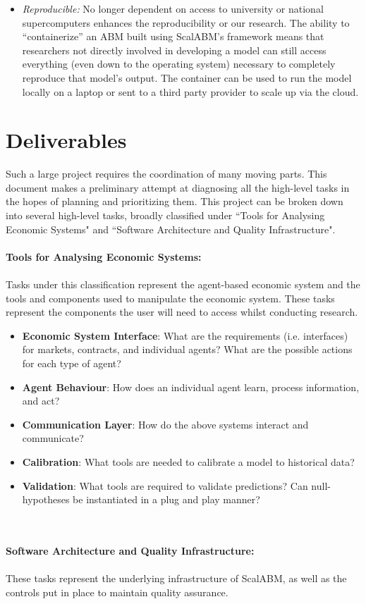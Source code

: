 \documentclass[a4paper]{article}
\begin{document}
\begin{itemize}
\item \textit{Reproducible:} No longer dependent on access to university or national supercomputers enhances the reproducibility or our research.  The ability to ``containerize'' an ABM built using ScalABM's framework means that researchers not directly involved in developing a model can still access everything (even down to the operating system) necessary to completely reproduce that model's output. The container can be used to run the model locally on a laptop or sent to a third party provider to scale up via the cloud.

\end{itemize}

\section{Deliverables}

Such a large project requires the coordination of many moving parts. This document makes a preliminary attempt at diagnosing all the high-level tasks in the hopes of planning and prioritizing them. This project can be broken down into several high-level tasks, broadly classified under ``Tools for Analysing Economic Systems" and ``Software Architecture and Quality Infrastructure". 
\\
\\
\textbf{Tools for Analysing Economic Systems:}
\\
\\
Tasks under this classification represent the agent-based economic system and the tools and components used to manipulate the economic system. These tasks represent the components the user will need to access whilst conducting research.

\begin{itemize}
	\item \textbf{Economic System Interface}: What are the requirements (i.e. interfaces) for markets, contracts, and individual agents? What are the possible actions for each type of agent? 
    \item \textbf{Agent Behaviour}: How does an individual agent learn, process information, and act?
    \item \textbf{Communication Layer}: How do the above systems interact and communicate? 
    \item \textbf{Calibration}: What tools are needed to calibrate a model to historical data?
    \item \textbf{Validation}: What tools are required to validate predictions? Can null-hypotheses be instantiated in a plug and play manner?
    \end{itemize}
\\
\\
\textbf{Software Architecture and Quality Infrastructure:}
\\
\\
These tasks represent the underlying infrastructure of ScalABM, as well as the controls put in place to maintain quality assurance. 
\end{document}
